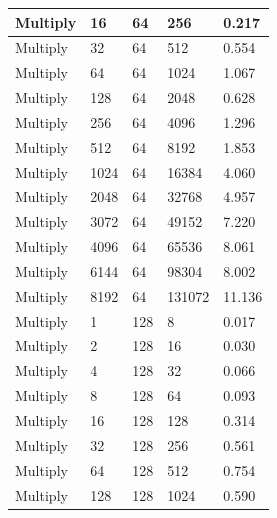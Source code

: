 \documentclass{article}
\begin{document}
\begin{longtable}{|l|l|l|l|l|}
Multiply           & 16   & 64          & 256               & 0.217             \\ \hline
Multiply           & 32   & 64          & 512               & 0.554             \\ \hline
Multiply           & 64   & 64          & 1024              & 1.067             \\ \hline
Multiply           & 128  & 64          & 2048              & 0.628             \\ \hline
Multiply           & 256  & 64          & 4096              & 1.296             \\ \hline
Multiply           & 512  & 64          & 8192              & 1.853             \\ \hline
Multiply           & 1024 & 64          & 16384             & 4.060             \\ \hline
Multiply           & 2048 & 64          & 32768             & 4.957             \\ \hline
Multiply           & 3072 & 64          & 49152             & 7.220             \\ \hline
Multiply           & 4096 & 64          & 65536             & 8.061             \\ \hline
Multiply           & 6144 & 64          & 98304             & 8.002             \\ \hline
Multiply           & 8192 & 64          & 131072            & 11.136            \\ \hline
Multiply           & 1    & 128         & 8                 & 0.017             \\ \hline
Multiply           & 2    & 128         & 16                & 0.030             \\ \hline
Multiply           & 4    & 128         & 32                & 0.066             \\ \hline
Multiply           & 8    & 128         & 64                & 0.093             \\ \hline
Multiply           & 16   & 128         & 128               & 0.314             \\ \hline
Multiply           & 32   & 128         & 256               & 0.561             \\ \hline
Multiply           & 64   & 128         & 512               & 0.754             \\ \hline
Multiply           & 128  & 128         & 1024              & 0.590             \\ \hline

\end{longtable}
\end{document}
